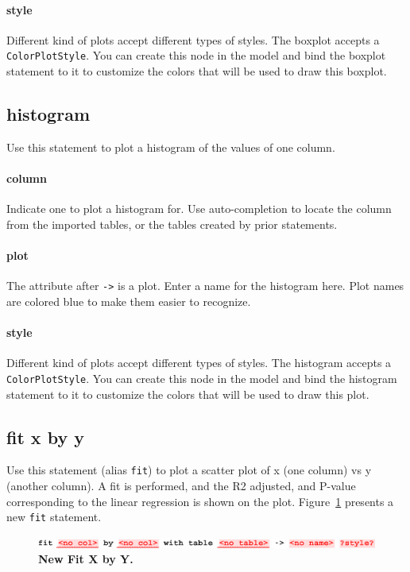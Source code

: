 \paragraph{style}
Different kind of plots accept different types of styles. The boxplot accepts a \texttt{Color\allowbreak{}Plot\allowbreak{}Style}. You can create this node in the model and bind the boxplot statement to it to customize the colors that will be used to draw this boxplot. 


\subsection{histogram}
Use this statement to plot a histogram of the values of one column.
\paragraph{column}
Indicate one to plot a histogram for.  Use auto-completion to locate the column from the imported tables, or the tables created by prior statements. 

\paragraph{plot}
The attribute after \texttt{->} is a plot. Enter a name for the histogram here. Plot names are colored blue to make them easier to recognize.

\paragraph{style}
Different kind of plots accept different types of styles. The histogram accepts a \texttt{Color\allowbreak{}Plot\allowbreak{}Style}. You can create this node in the model and bind the histogram statement to it to customize the colors that will be used to draw this plot. 



\subsection{fit x by y}
Use this statement (alias \texttt{fit}) to plot a scatter plot of x (one column) vs y (another column). A fit is performed, and the R2 adjusted, and P-value corresponding to the linear regression is shown on the plot. Figure~\ref{fig:NewFitXByY} presents a new \texttt{fit} statement.

\begin{figure}[h!tbp]
  \centering
  \includegraphics[width=\figWidthWide]{figures/NewFitXByY.pdf}
\caption[New Fit X by Y.]{\textbf{New Fit X by Y.}}
\label{fig:NewFitXByY}
\end{figure}

